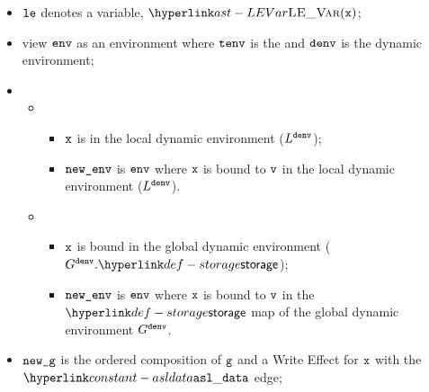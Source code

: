 \ProseParagraph
\AllApply
\begin{itemize}
    \item $\vle$ denotes a variable, $\LEVar(\vx)$;
    \item view $\env$ as an environment where $\tenv$ is the \staticenvironmentterm{} and $\denv$ is the dynamic environment;
    \item \OneApplies
    \begin{itemize}
        \item {}
        \begin{itemize}
            \item $\vx$ is in the local dynamic environment ($L^\denv$);
            \item $\newenv$ is $\env$ where $\vx$ is bound to $\vv$ in the local dynamic environment ($L^\denv$).
        \end{itemize}

        \item {}
        \begin{itemize}
            \item $\vx$ is bound in the global dynamic environment ($G^\denv.\storage$);
            \item $\newenv$ is $\env$ where $\vx$ is bound to $\vv$ in the $\storage$ map of the global dynamic environment $G^\denv$.
        \end{itemize}
    \end{itemize}
    \item $\newg$ is the ordered composition of $\vg$ and a Write Effect for $\vx$ with the $\asldata$ edge;
\end{itemize}

\FormallyParagraph
\begin{mathpar}
\end{mathpar}

\begin{mathpar}
\end{mathpar}

